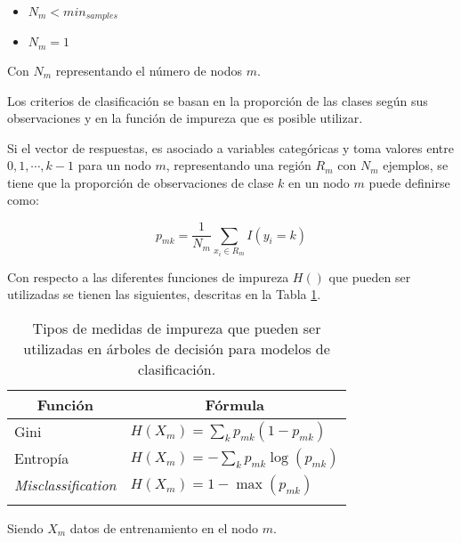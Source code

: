 \begin{itemize}
	
	\item $N_{m} < min_{samples}$ 
	
	\item $N_{m} = 1$
\end{itemize}

Con $N_{m}$ representando el número de nodos $m$.

Los criterios de clasificación se basan en la proporción de las clases según sus observaciones y en la función de impureza que es posible utilizar.

Si el vector de respuestas, es asociado a variables categóricas y toma valores entre $0,1,\cdots,k-1$ para un nodo $m$, representando una región $R_{m}$ con $N_{m}$ ejemplos, se tiene que la proporción  de observaciones de clase $k$ en un nodo $m$ puede definirse como:

\begin{equation}
	p_{mk} = \dfrac{1}{N_m} \sum_{x_i \in R_m} I(y_i = k)
\end{equation}

Con respecto a las diferentes funciones de impureza $H()$ que pueden ser utilizadas se tienen las siguientes, descritas en la Tabla \ref{tab:tab-form-impureza}. 

\begin{longtable}[c]{|l|l|}
	\hline
	\multicolumn{1}{|c|}{\textbf{Función}} & \multicolumn{1}{c|}{\textbf{Fórmula}}   \\ \hline
	\endfirsthead
	\endhead
	Gini                                   & $H(X_m) = \sum_k p_{mk} (1 - p_{mk})$   \\ \hline
	Entropía                               & $H(X_m) = - \sum_k p_{mk} \log(p_{mk})$ \\ \hline
	\textit{Misclassification}                      & $H(X_m) = 1 - \max(p_{mk})$             \\ \hline
	\caption{Tipos de medidas de impureza que pueden ser utilizadas en árboles de decisión para modelos de clasificación.
	}
	\label{tab:tab-form-impureza}\\
\end{longtable} 

Siendo $X_{m}$ datos de entrenamiento en el nodo $m$.

